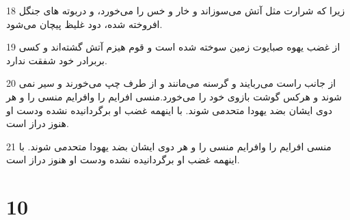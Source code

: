 \par 18 زیرا که شرارت مثل آتش می‌سوزاند و خار و خس را می‌خورد، و دربوته های جنگل افروخته شده، دود غلیظ پیچان می‌شود.
\par 19 از غضب یهوه صبایوت زمین سوخته شده است و قوم هیزم آتش گشته‌اند و کسی بربرادر خود شفقت ندارد.
\par 20 از جانب راست می‌ربایند و گرسنه می‌مانند و از طرف چپ می‌خورند و سیر نمی شوند و هرکس گوشت بازوی خود را می‌خورد.منسی افرایم را وافرایم منسی را و هر دوی ایشان بضد یهودا متحدمی شوند. با اینهمه غضب او برگردانیده نشده ودست او هنوز دراز است.
\par 21 منسی افرایم را وافرایم منسی را و هر دوی ایشان بضد یهودا متحدمی شوند. با اینهمه غضب او برگردانیده نشده ودست او هنوز دراز است.
 
\chapter{10}


